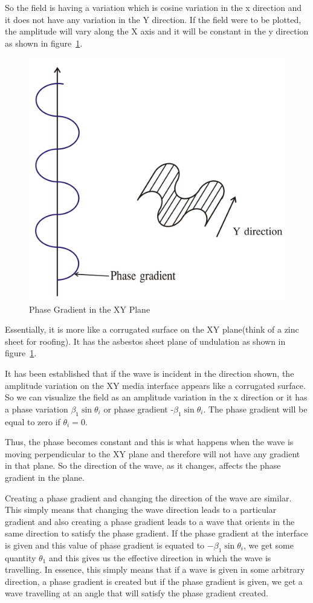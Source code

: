 So the field is having a variation which is cosine variation in the x direction and it does not have any variation in the Y direction. If the field were to be plotted, the amplitude will vary along the X axis and it will be constant in the y direction as shown in figure~\ref{fig:group30c}.
\begin{figure}[h]
\centering
\includegraphics[width=.7\linewidth]{graphics/group30c}
\caption{Phase Gradient in the XY Plane}
\label{fig:group30c}
\end{figure}

Essentially, it is more like a corrugated surface on the XY plane(think of a zinc sheet for roofing). It has the asbestos sheet plane of undulation as shown in figure~\ref{fig:group30c}.

It has been established that if the wave is incident in the direction shown, the amplitude variation on the XY media interface appears like a corrugated surface. So we can visualize the field as an amplitude variation in the x direction or it has a phase variation $\beta_1\sin \theta_i$ or phase gradient -$\beta_1\sin\theta_i$. The phase gradient will be equal to zero if $\theta_i=0$.

Thus, the phase becomes constant and this is what happens when the wave is moving perpendicular to the XY plane and therefore will not have any gradient in that plane. So the direction of the wave, as it changes, affects the phase gradient in the plane.

Creating a phase gradient and changing the direction of the wave are similar. This simply means that changing the wave direction leads to a particular gradient and also creating a phase gradient leads to a wave that orients in the same direction to satisfy the phase gradient. If the phase gradient at the interface is given and this value of phase gradient is equated to $-\beta_1 \sin \theta_i$, we get some quantity $\theta_1$ and this gives us the effective direction in which the wave is travelling. In essence, this simply means that if a wave is given in some arbitrary direction, a phase gradient is created but if the phase gradient is given, we get a wave travelling at an angle that will satisfy the phase gradient created.

